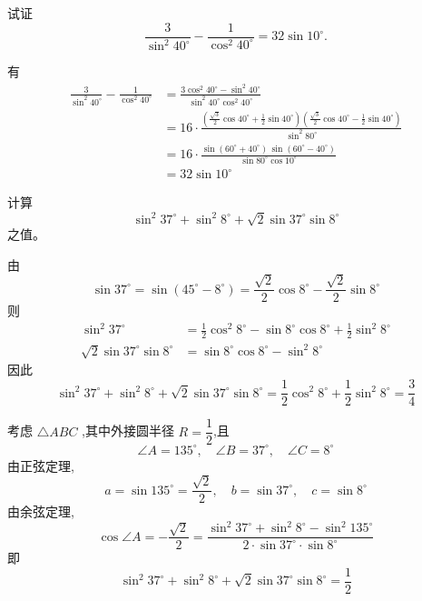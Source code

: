 \begin{questions}
    \question 试证 
    \[\dfrac{3}{\sin^2 40^\circ} - \dfrac{1}{\cos^2 40^\circ}=32 \sin 10^\circ.
    \]
    \begin{solution}
        有
        \begin{align*}
        \frac{3}{\sin^2 40^\circ} - \frac{1}{\cos^2 40^\circ} 
        &= \frac{3 \cos^2 40^\circ - \sin^2 40^\circ}{\sin^2 40^\circ \cos^2 40^\circ} \\[6pt]
        &= 16 \cdot \frac{\left(\displaystyle\frac{\sqrt{3}}{2} \cos 40^\circ + \frac{1}{2} \sin 40^\circ\right)
        \left(\displaystyle\frac{\sqrt{3}}{2} \cos 40^\circ - \frac{1}{2} \sin 40^\circ\right)}{\sin^2 80^\circ} \\[6pt]
        &= 16 \cdot \frac{\sin(60^\circ + 40^\circ)\,\sin(60^\circ - 40^\circ)}{\sin 80^\circ \cos 10^\circ} \\[6pt]
        &= 32 \sin 10^\circ
        \end{align*}
    \end{solution}

    \question 计算 $$\sin^2 37^\circ + \sin^2 8^\circ + \sqrt{2}\sin 37^\circ \sin 8^\circ$$ 之值。
    \begin{solution}
        由
        \[
        \sin 37^\circ = \sin(45^\circ - 8^\circ) = \frac{\sqrt{2}}{2} \cos 8^\circ - \frac{\sqrt{2}}{2} \sin 8^\circ
        \]
        则
        \[
        \begin{aligned}
        \sin^2 37^\circ &= \frac{1}{2} \cos^2 8^\circ - \sin 8^\circ \cos 8^\circ + \frac{1}{2} \sin^2 8^\circ \\
        \sqrt{2}\sin 37^\circ \sin 8^\circ &= \sin 8^\circ \cos 8^\circ - \sin^2 8^\circ
        \end{aligned}
        \]
        因此
        \[
        \sin^2 37^\circ + \sin^2 8^\circ + \sqrt{2}\sin 37^\circ \sin 8^\circ = \frac{1}{2} \cos^2 8^\circ + \frac{1}{2} \sin^2 8^\circ = \frac{3}{4}
        \]
    \end{solution}
    \begin{solution}
        考虑 $\triangle ABC$ ,其中外接圆半径 $R = \dfrac{1}{2}$,且
        \[
        \angle A = 135^\circ,\quad \angle B = 37^\circ,\quad \angle C = 8^\circ
        \]
        由正弦定理,
        \[
        a = \sin 135^\circ = \frac{\sqrt{2}}{2},\quad b = \sin 37^\circ, \quad c = \sin 8^\circ
        \]
        由余弦定理,
        \[
        \cos \angle A = -\frac{\sqrt{2}}{2} = \frac{\sin^2 37^\circ + \sin^2 8^\circ - \sin^2 135^\circ}{2 \cdot \sin 37^\circ \cdot \sin 8^\circ}
        \]
        即
        \[
        \sin^2 37^\circ + \sin^2 8^\circ + \sqrt{2} \sin 37^\circ \sin 8^\circ = \frac{1}{2}
        \]
    \end{solution}
    

\end{questions}
